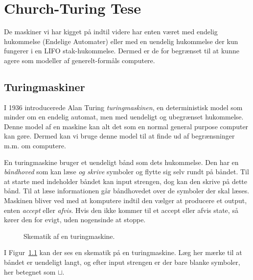 \chapter{Church-Turing Tese}

De maskiner vi har kigget på indtil videre har enten været med endelig hukommelse (Endelige Automater) eller med en uendelig hukommelse der kun fungerer i en LIFO stak-hukommelse. Dermed er de for begrænset til at kunne agere som modeller af generelt-formåls computere.

\section{Turingmaskiner}%
\label{sec:turingmachines}

I 1936 introducerede Alan Turing \textit{turingmaskinen}, en deterministisk model som minder om en endelig automat, men med uendeligt og ubegrænset hukommelse. Denne model af en maskine kan alt det som en normal general purpose computer kan gøre. Dermed kan vi bruge denne model til at finde ud af begrænsninger m.m. om computere.

En turingmaskine bruger et uendeligt bånd som dets hukommelse. Den har en \textit{båndhoved} som kan læse \textit{og skrive} symboler og flytte sig selv rundt på båndet. Til at starte med indeholder båndet kan input strengen, dog kan den skrive på dette bånd. Til at læse informationen går båndhovedet over de symboler der skal læses. Maskinen bliver ved med at komputere indtil den vælger at producere et output, enten \textit{accept} eller \textit{afvis}. Hvis den ikke kommer til et accept eller afvis state, så kører den for evigt, uden nogensinde at stoppe.

\begin{figure}[ht]
  \centering
  \caption{\label{fig:turingschematic} Skematik af en turingmaskine.}
\end{figure}
I Figur~\ref{fig:turingschematic} kan der ses en skematik på en turingmaskine. Læg her mærke til at båndet er uendeligt langt, og efter input strengen er der bare blanke symboler, her betegnet som $\sqcup$.

